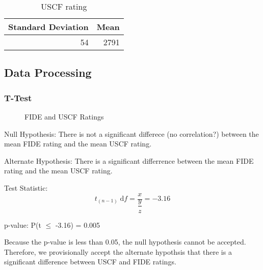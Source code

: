 \documentclass[12pt]{article}
\begin{document}
\begin{table}
\begin{center}
\begin{tabular}{rr}
Standard Deviation & Mean\\
\hline
54 & 2791\\
\end{tabular}
    \caption{USCF rating}
\end{center}
\end{table}


\subsection{Data Processing}
\subsubsection{T-Test}
\begin{figure}[H]
\centering
{}
\caption{FIDE and USCF Ratings}
\end{figure}

Null Hypothesis: There is not a significant differece (no correlation?) between the mean FIDE rating and the mean USCF rating.

Alternate Hypothesis: There is a significant differrence between the mean FIDE rating and the mean USCF rating. 

Test Statistic: 
\begin{equation}
    t_{(n-1)} \; \textrm{d}f = \dfrac{x}{\dfrac{y}{z}} = -3.16
\end{equation}

p-value: P(t \(\leq\) -3.16) = 0.005

Because the p-value is less than 0.05, the null hypothesis cannot be accepted. Therefore, we provisionally accept the alternate hypothsis that there is a significant difference between USCF and FIDE ratings.
\end{document}
